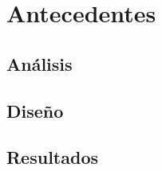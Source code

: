 
\chapter{Antecedentes} %

\label{Chapter3} %


\section{Análisis}
\lipsum

\section{Diseño}
\lipsum

\section{Resultados}
\lipsum
